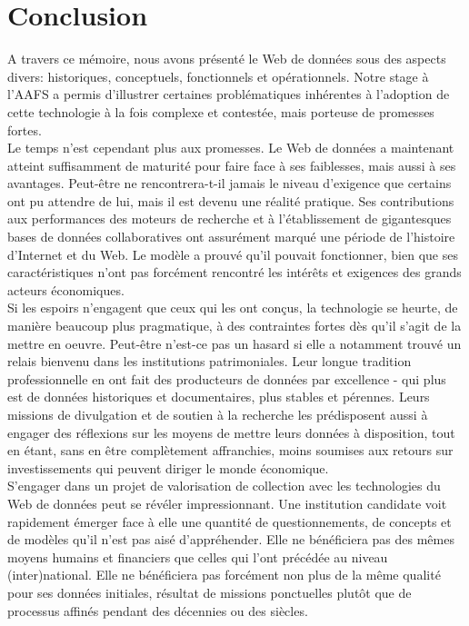 \documentclass[a4paper,12pt,twoside]{book}
\begin{document}
	\chapter{Conclusion}

A travers ce mémoire, nous avons présenté le Web de données sous des aspects divers: historiques, conceptuels, fonctionnels et opérationnels. Notre stage à l'AAFS a permis d'illustrer certaines problématiques inhérentes à l'adoption de cette technologie à la fois complexe et contestée, mais porteuse de promesses fortes.\\

Le temps n'est cependant plus aux promesses. Le Web de données a maintenant atteint suffisamment de maturité pour faire face à ses faiblesses, mais aussi à ses avantages. Peut-être ne rencontrera-t-il jamais le niveau d'exigence que certains ont pu attendre de lui, mais il est devenu une réalité pratique. Ses contributions aux performances des moteurs de recherche et à l'établissement de gigantesques bases de données collaboratives ont assurément marqué une période de l'histoire d'Internet et du Web. Le modèle a prouvé qu'il pouvait fonctionner, bien que ses caractéristiques n'ont pas forcément rencontré les intérêts et exigences des grands acteurs économiques.\\

Si les espoirs n'engagent que ceux qui les ont conçus, la technologie se heurte, de manière beaucoup plus pragmatique, à des contraintes fortes dès qu'il s'agit de la mettre en oeuvre. Peut-être n'est-ce pas un hasard si elle a notamment trouvé un relais bienvenu dans les institutions patrimoniales. Leur longue tradition professionnelle en ont fait des producteurs de données par excellence - qui plus est de données historiques et documentaires, plus stables et pérennes. Leurs missions de divulgation et de soutien à la recherche les prédisposent aussi à engager des réflexions sur les moyens de mettre leurs données à disposition, tout en étant, sans en être complètement affranchies, moins soumises aux retours sur investissements qui peuvent diriger le monde économique.\\

S'engager dans un projet de valorisation de collection avec les technologies du Web de données peut se révéler impressionnant. Une institution candidate voit rapidement émerger face à elle une quantité de questionnements, de concepts et de modèles qu'il n'est pas aisé d'appréhender. Elle ne bénéficiera pas des mêmes moyens humains et financiers que celles qui l'ont précédée au niveau (inter)national. Elle ne bénéficiera pas forcément non plus de la même qualité pour ses données initiales, résultat de missions ponctuelles plutôt que de processus affinés pendant des décennies ou des siècles.\\
\end{document}
